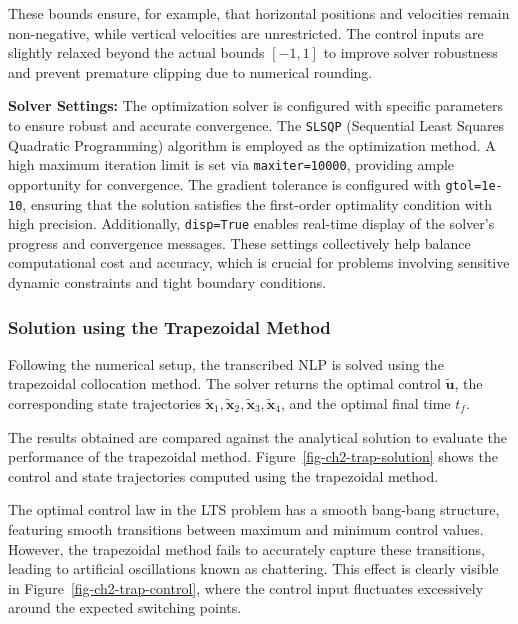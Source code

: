 \documentclass[
  number,
  preprint]{elsarticle}
\begin{document}
These bounds ensure, for example, that horizontal positions and
velocities remain non-negative, while vertical velocities are
unrestricted. The control inputs are slightly relaxed beyond the actual
bounds \([-1, 1]\) to improve solver robustness and prevent premature
clipping due to numerical rounding.

\textbf{Solver Settings:} The optimization solver is configured with
specific parameters to ensure robust and accurate convergence. The
\texttt{SLSQP} (Sequential Least Squares Quadratic Programming)
algorithm is employed as the optimization method. A high maximum
iteration limit is set via \texttt{maxiter=10000}, providing ample
opportunity for convergence. The gradient tolerance is configured with
\texttt{gtol=1e-10}, ensuring that the solution satisfies the
first-order optimality condition with high precision. Additionally,
\texttt{disp=True} enables real-time display of the solver's progress
and convergence messages. These settings collectively help balance
computational cost and accuracy, which is crucial for problems involving
sensitive dynamic constraints and tight boundary conditions.

\subsubsection{Solution using the Trapezoidal
Method}\label{solution-using-the-trapezoidal-method}

Following the numerical setup, the transcribed NLP is solved using the
trapezoidal collocation method. The solver returns the optimal control
\(\tilde{\mathbf{u}}\), the corresponding state trajectories
\(\tilde{\mathbf{x}}_1, \tilde{\mathbf{x}}_2, \tilde{\mathbf{x}}_3, \tilde{\mathbf{x}}_4\),
and the optimal final time \(t_f\).

The results obtained are compared against the analytical solution to
evaluate the performance of the trapezoidal method.
Figure~\ref{fig-ch2-trap-solution} shows the control and state
trajectories computed using the trapezoidal method.

The optimal control law in the LTS problem has a smooth bang-bang
structure, featuring smooth transitions between maximum and minimum
control values. However, the trapezoidal method fails to accurately
capture these transitions, leading to artificial oscillations known as
chattering. This effect is clearly visible in
Figure~\ref{fig-ch2-trap-control}, where the control input fluctuates
excessively around the expected switching points.
\end{document}

